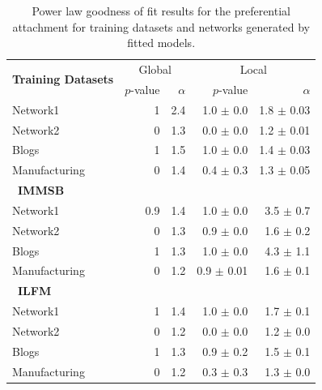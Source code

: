 \begin{table}[t]
    \caption{Power law goodness of fit results for the preferential attachment for training datasets and networks generated by fitted models.}
\centering
  \begin{tabular}{lrrrr}
      \multirow{2}{*}{\textbf{Training Datasets}}  &
      \multicolumn{2}{c}{Global} & \multicolumn{2}{c}{Local}\\
      \cmidrule(r){2-3} \cmidrule(l){4-5}
      &   $p$-value &   $\alpha$   & $p$-value & $\alpha$   \\
  	\hline
    Network1       & 1 & 2.4 &   1.0 $\pm$ 0.0  &  1.8 $\pm$ 0.03  \\
    Network2       & 0 & 1.3 &   0.0 $\pm$ 0.0  &  1.2 $\pm$ 0.01 \\
    Blogs          & 1 & 1.5 &   1.0 $\pm$ 0.0  &  1.4 $\pm$ 0.03\\
    Manufacturing  & 0 & 1.4 &   0.4 $\pm$ 0.3  &  1.3 $\pm$ 0.05 \\
  	\hline

      \ \textbf{IMMSB} &&&& \\
  	\hline
    Network1       & 0.9 & 1.4 &   1.0 \(\pm\) 0.0   &  3.5 \(\pm\) 0.7 \\
    Network2       & 0 & 1.3 &   0.9 \(\pm\) 0.0   &  1.6 \(\pm\) 0.2 \\
    Blogs          & 1 & 1.3 &   1.0 \(\pm\) 0.0   &  4.3 \(\pm\) 1.1 \\
    Manufacturing  & 0 & 1.2 &   0.9 \(\pm\) 0.01  &  1.6 \(\pm\) 0.1 \\
  	\hline

      \ \textbf{ILFM} &&&& \\
  	\hline
    Network1      & 1 & 1.4 &   1.0 \(\pm\) 0.0  &  1.7 \(\pm\) 0.1 \\
    Network2      & 0 & 1.2 &   0.0 \(\pm\) 0.0 &  1.2 \(\pm\) 0.0 \\
    Blogs         & 1 & 1.3 &   0.9 \(\pm\) 0.2  &  1.5 \(\pm\) 0.1 \\
    Manufacturing & 0 & 1.2 &   0.3 \(\pm\) 0.3  &  1.3 \(\pm\) 0.0 \\
  	\hline
  \end{tabular}
\label{table:me_gofit}
\end{table}

